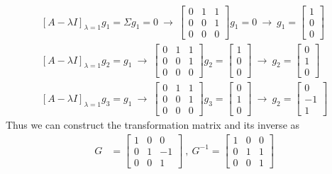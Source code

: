 \documentclass[twoside]{article}
\begin{document}
\begin{align*}
 \left[ A - \lambda I \right]_{\lambda = 1} g_1 = \Sigma g_1 = 0 \ \rightarrow \ 
 \left[ \begin{array}{ccc} 0 & 1 & 1 \\ 0 & 0 & 1 \\ 0 & 0 & 0 \end{array} \right] g_1 = 0 \ \rightarrow \ g_1 =  
 \left[ \begin{array}{c} 1 \\ 0  \\ 0  \end{array} \right]
 \\
  \left[ A - \lambda I \right]_{\lambda = 1} g_2 = g_1 \ \rightarrow \
  \left[ \begin{array}{ccc} 0 & 1 & 1 \\ 0 & 0 & 1 \\ 0 & 0 & 0 \end{array} \right] g_2 =  \left[ \begin{array}{c} 1 \\ 0  \\ 0  \end{array} \right] \ \rightarrow \ 
  g_2 =   \left[ \begin{array}{c} 0 \\ 1  \\ 0  \end{array} \right]
  \\
  \left[ A - \lambda I \right]_{\lambda = 1} g_3 = g_1 \ \rightarrow \
  \left[ \begin{array}{ccc} 0 & 1 & 1 \\ 0 & 0 & 1 \\ 0 & 0 & 0 \end{array} \right] g_3 =  \left[ \begin{array}{c} 0 \\ 1  \\ 0  \end{array} \right] \ \rightarrow \ 
  g_2 =   \left[ \begin{array}{c} 0 \\ -1  \\ 1  \end{array} \right]
\end{align*}
%
Thus we can construct the transformation matrix and its inverse as
\begin{align*}
 G &= \left[ \begin{array}{ccc} 1 & 0 & 0 \\ 0 & 1 & -1  \\ 0 & 0 & 1  \end{array} \right]
 \  , \ 
 G^{-1} = \left[ \begin{array}{ccc} 1 & 0 & 0 \\ 0 & 1 & 1  \\ 0 & 0 & 1  \end{array} \right]
\end{align*}
\end{document}

